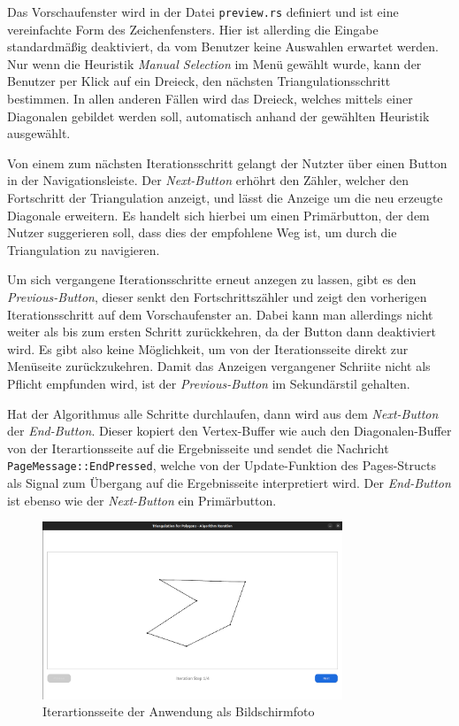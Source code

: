 Das Vorschaufenster wird in der Datei \lstinline{preview.rs} definiert und ist eine vereinfachte Form des Zeichenfensters. Hier ist allerding die Eingabe standardmäßig deaktiviert, da vom Benutzer keine 
Auswahlen erwartet werden. Nur wenn die Heuristik \emph{Manual Selection} im Menü gewählt wurde, kann der Benutzer per Klick auf ein Dreieck, den nächsten Triangulationsschritt bestimmen.
In allen anderen Fällen wird das Dreieck, welches mittels einer Diagonalen gebildet werden soll, automatisch anhand der gewählten Heuristik ausgewählt.

Von einem zum nächsten Iterationsschritt gelangt der Nutzter über einen Button in der Navigationsleiste. Der \emph{Next-Button} erhöhrt den Zähler, welcher den Fortschritt der Triangulation anzeigt, 
und lässt die Anzeige um die neu erzeugte Diagonale erweitern. Es handelt sich hierbei um einen Primärbutton, der dem Nutzer suggerieren soll, dass dies der empfohlene Weg ist, um durch die Triangulation zu navigieren.

Um sich vergangene Iterationsschritte erneut anzegen zu lassen, gibt es den \emph{Previous-Button}, dieser senkt den Fortschrittszähler und zeigt den vorherigen Iterationsschritt auf dem Vorschaufenster an.
Dabei kann man allerdings nicht weiter als bis zum ersten Schritt zurückkehren, da der Button dann deaktiviert wird. Es gibt also keine Möglichkeit, um von der Iterationsseite direkt zur Menüseite zurückzukehren.
Damit das Anzeigen vergangener Schriite nicht als Pflicht empfunden wird, ist der \emph{Previous-Button} im Sekundärstil gehalten.

Hat der Algorithmus alle Schritte durchlaufen, dann wird aus dem \emph{Next-Button} der \emph{End-Button}. Dieser kopiert den Vertex-Buffer wie auch den Diagonalen-Buffer von der Iterartionsseite auf die Ergebnisseite 
und sendet die Nachricht \lstinline{PageMessage::EndPressed}, welche von der Update-Funktion des Pages-Structs als Signal zum Übergang auf die Ergebnisseite interpretiert wird. Der \emph{End-Button} ist ebenso wie der 
\emph{Next-Button} ein Primärbutton.

\begin{figure}[h]
    \centering
    \includegraphics[width=0.8\textwidth]{bilder/iteration_final.png}
    \caption[Iterationsseite der Anwendung]{Iterartionsseite der Anwendung als Bildschirmfoto}
\end{figure}

